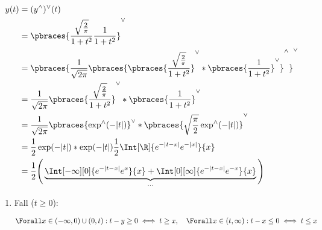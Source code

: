 \begin{solution}
\begin{align*}
    y(t)
    & =
    (y^\wedge)^\vee(t) \\
    & =
    \pbraces
    {
        \frac
        {
            \sqrt \frac{2}{\pi}
        }{
            1 + t^2
        }
        \frac{1}{1 + t^2}
    }^\vee \\
    & =
    \pbraces
    {
        \frac{1}{\sqrt{2 \pi}}
        \pbraces
        {
            \pbraces
            {
                \frac
                {
                    \sqrt \frac{2}{\pi}
                }{
                    1 + t^2
                }
            }^\vee
            \ast
            \pbraces
            {
                \frac{1}{1 + t^2}
            }^\vee
        }^\wedge    
    }^\vee \\
    & =
    \frac{1}{\sqrt{2 \pi}}
    \pbraces
    {
        \frac
        {
            \sqrt \frac{2}{\pi}
        }{
            1 + t^2
        }
    }^\vee
    \ast
    \pbraces
    {
        \frac{1}{1 + t^2}
    }^\vee \\
    & =
    \frac{1}{\sqrt{2 \pi}}
    \pbraces
    {
        \exp^\wedge(-|t|)
    }^\vee
    \ast
    \pbraces
    {
        \sqrt \frac{\pi}{2}
        \exp^\wedge(-|t|)
    }^\vee \\
    & =
    \frac{1}{2}
    \exp(-|t|)
    \ast
    \exp(-|t|)
    \frac{1}{2}
    \Int[\R]
    {
        e^{-|t-x|}
        e^{-|x|}
    }{x} \\
    & =
    \frac{1}{2}
    \Bigg (
        \underbrace
        {
            \Int[-\infty][0]
            {
                e^{-|t-x|}
                e^x
            }{x}
            +
            \Int[0][\infty]
            {
                e^{-|t-x|}
                e^{-x}
            }{x}
        }_{\cdots}
    \Bigg )
\end{align*}

\begin{enumerate}[label = \arabic*.]

    \item Fall ($t \geq 0$):
    
    \begin{align*}
        \Forall x \in (-\infty, 0) \cup (0, t):
        t - y \geq 0
        \iff
        t \geq x,
        \quad
        \Forall x \in (t, \infty):
        t - x \leq 0
        \iff
        t \leq x
    \end{align*}


\end{enumerate}
\end{solution}
